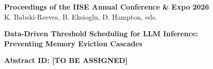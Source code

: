 \documentclass[10pt]{article}
\begin{document}
\begin{center}
{\fontsize{12}{14}\selectfont\bfseries Proceedings of the IISE Annual Conference \& Expo 2026}\\
{\fontsize{10}{12}\selectfont K. Babski-Reeves, B. Eksioglu, D. Hampton, eds.}
\end{center}

\vspace{0.5cm}

\begin{center}
{\fontsize{16}{19}\selectfont\bfseries Data-Driven Threshold Scheduling for LLM Inference:\\
Preventing Memory Eviction Cascades}
\end{center}

\vspace{0.3cm}

\begin{center}
{\fontsize{12}{14}\selectfont\bfseries Abstract ID: [TO BE ASSIGNED]}
\end{center}

\vspace{0.5cm}


\end{document}
